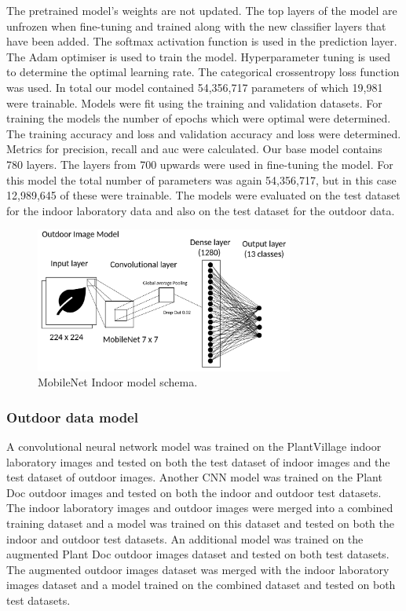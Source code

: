 \documentclass[conference]{IEEEtran}
\begin{document}
The pretrained model's weights are not updated. The top layers of the model are unfrozen when fine-tuning and trained along with the new classifier layers that have been added. The softmax activation function is used in the prediction layer. The Adam optimiser is used to train the model. Hyperparameter tuning is used to determine the optimal learning rate. The categorical crossentropy loss function was used. In total our model contained 54,356,717 parameters of which 19,981 were trainable. Models were fit using the training and validation datasets. For training the models the number of epochs which were optimal were determined. The training accuracy and loss and validation accuracy and loss were determined. Metrics for precision, recall and auc were calculated. Our base model contains 780 layers. The layers from 700 upwards were used in fine-tuning the model. For this model the total number of parameters was again 54,356,717, but in this case 12,989,645 of these were trainable. The models were evaluated on the test dataset for the indoor laboratory data and also on the test dataset for the outdoor data.  
\begin{figure}[htbp]
\centerline{\includegraphics[width=8.5cm]{ModelOutdoorsMobileNet.png}}
\caption{MobileNet Indoor model schema.}
\label{fig}
\end{figure}

\subsubsection{Outdoor data model}
A convolutional neural network model was trained on the PlantVillage indoor laboratory images and tested on both the test dataset of indoor images and the test dataset of outdoor images. Another CNN model was trained on the Plant Doc outdoor images and tested on both the indoor and outdoor test datasets. The indoor laboratory images and outdoor images were merged into a combined training dataset and a model was trained on this dataset and tested on both the indoor and outdoor test datasets. An additional model was trained on the augmented Plant Doc outdoor images dataset and tested on both test datasets. The augmented outdoor images dataset was merged with the indoor laboratory images dataset and a model trained on the combined dataset and tested on both test datasets. 
\end{document}
